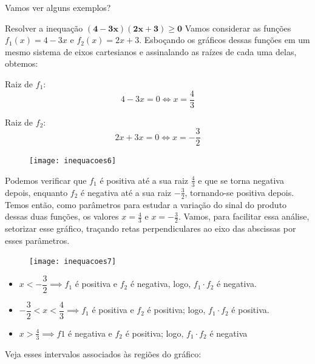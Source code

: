 Vamos ver alguns exemplos?

\begin{example}{Resolver a inequação $\bm{(4-3x)(2x+3)\geq0}$}
Vamos considerar as funções $f_1(x)=4-3x$ e $f_2(x)=2x+3$. Esboçando os gráficos dessas funções em um mesmo sistema de eixos cartesianos e assinalando as raízes de cada uma delas, obtemos:

\begin{multicols}{2}
\centering
Raiz de $f_1$:
\begin{equation*}
4-3x=0\iff x=\frac{4}{3}
\end{equation*}

Raiz de $f_2$:
\begin{equation*}
2x+3x=0\iff x=-\frac{3}{2}
\end{equation*}
\end{multicols}

\begin{figure}[H]
\centering

\texttt{[image: inequacoes6]}
\end{figure}

Podemos verificar que $f_1$ é positiva até a sua raiz $\frac{4}{3}$ e que se torna negativa depois, enquanto $f_2$ é negativa até a sua raiz $-\frac{3}{2}$, tornando-se positiva depois. Temos então, como parâmetros para estudar a variação do sinal do produto dessas duas funções, os valores $x=\frac{4}{3}$ e $x=-\frac{3}{2}$. Vamos, para facilitar essa análise, setorizar esse gráfico, traçando retas perpendiculares ao eixo das abscissas por esses parâmetros.

\begin{figure}[H]
\centering

\texttt{[image: inequacoes7]}
\end{figure}

\begin{itemize}
\item $x<-\dfrac{3}{2}\implies f_1$ é positiva e $f_2$ é negativa, logo, $f_1\cdot f_2$ é negativa.
\item $-\dfrac{3}{2}<x<\dfrac{4}{3} \implies f_1$ é positiva e $f_2$ é positiva; logo, $f_1\cdot f_2$ é positiva.
\item $x>\frac{4}{3} \implies f1$ é negativa e $f_2$ é positiva; logo, $f_1\cdot f_2$ é negativa
\end{itemize}

Veja esses intervalos associados às regiões do gráfico:

\setlength{\columnsep}{0pt}
\begin{multicols}{3}
\centering


\end{multicols}
\end{example}
